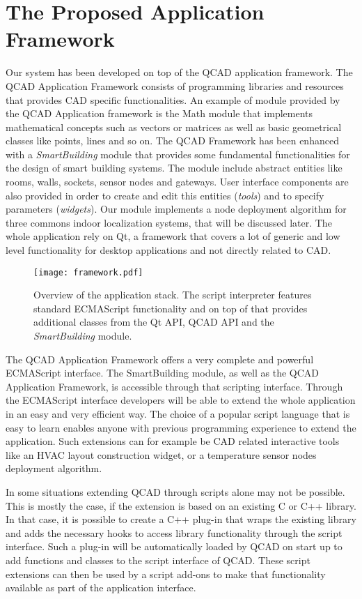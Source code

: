 \section{The Proposed Application Framework}\label{sec:components}
Our system has been developed on top of the QCAD application framework. The QCAD Application Framework consists of programming libraries and resources that provides CAD specific functionalities. An example of module provided by the QCAD Application framework is the Math module that implements mathematical concepts such as vectors or matrices as well as basic geometrical classes like points, lines and so on. The QCAD Framework has been enhanced with a \emph{SmartBuilding} module that provides some fundamental functionalities for the design of smart building systems. The module include abstract entities like rooms, walls, sockets, sensor nodes and gateways. User interface components are also provided in order to create and edit this entities (\emph{tools}) and to specify parameters (\emph{widgets}). Our module implements a node deployment algorithm for three commons indoor localization systems, that will be discussed later.
The whole application rely on Qt, a framework that covers a lot of generic and low level functionality for desktop applications and not directly related to CAD.
\begin{figure}[h!tb]
\centering\texttt{[image: framework.pdf]}
\caption[Overview of the CAD application framework stack.]{Overview of the application stack. The script interpreter features standard ECMAScript functionality and on top of that provides additional classes from the Qt API, QCAD API and the \emph{SmartBuilding} module.}
\end{figure}

The QCAD Application Framework offers a very complete and powerful ECMAScript interface. The SmartBuilding module, as well as the QCAD Application Framework, is accessible through that scripting interface. Through the ECMAScript interface developers will be able to extend the whole application in an easy and very efficient way. The choice of a popular script language that is easy to learn enables anyone with previous programming experience to extend the application. Such extensions can for example be CAD related interactive tools like an HVAC layout construction widget, or a temperature sensor nodes deployment algorithm.

In some situations extending QCAD through scripts alone may not be possible. This is mostly the case, if the extension is based on an existing C or C++ library. In that case, it is possible to create a C++ plug-in that wraps the existing library and adds the necessary hooks to access library functionality through the script interface. Such a plug-in will be automatically loaded by QCAD on start up to add functions and classes to the script interface of QCAD. These script extensions can then be used by a script add-ons to make that functionality available as part of the application interface.


